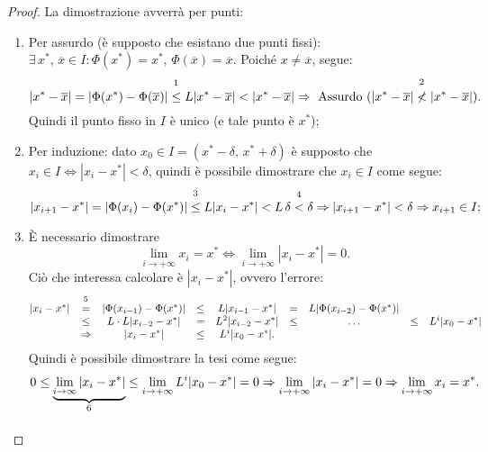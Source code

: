 \begin{proof}
	La dimostrazione avverrà per punti:
	\begin{enumerate}
		\item Per assurdo (è supposto che esistano due punti fissi): $\exists\, x^*,\, \overline{x}\in I: \Phi(x^*)=x^*,\, \Phi(\overline{x})=\overline{x}$. Poiché $x \neq \overline{x}$, segue:
		\begin{equation*}
			|x^*-\overline{x}|=|\Phi(x^*)-\Phi(\overline{x})|\overset{\footnotemark}{\leq}L|x^*-\overline{x}|<|x^*-\overline{x}| \Rightarrow\text{ Assurdo } (|x^*-\overline{x}|\overset{\footnotemark}{\nless}|x^*-\overline{x}|).
		\end{equation*}
		Quindi il punto fisso in $I$ è unico (e tale punto è $x^*$);
		\addtocounter{footnote}{-1}
		\item Per induzione: dato $x_0 \in I = (x^*-\delta,\, x^* + \delta)$ è supposto che $x_i\in I \iff |x_i-x^*|<\delta$, quindi è possibile dimostrare che $x_i\in I$ come segue:
		\begin{equation*}
			|x_{i+1}-x^*|=|\Phi(x_i)-\Phi(x^*)|\overset{\footnotemark}{\leq}L|x_i - x^*| < L\,\delta\overset{\footnotemark}{<}\delta\Rightarrow |x_{i+1}-x^*|<\delta\Rightarrow x_{i+1}\in I;
		\end{equation*}
		\item È necessario dimostrare
		\begin{equation*}
			\lim_{i\to + \infty}{x_i}=x^*\iff \lim_{i\to + \infty}{|x_i-x^*|}=0.
		\end{equation*}
		Ciò che interessa calcolare è $|x_i-x^*|$, ovvero l'errore:
		\begin{equation*}
			\begin{matrix}
				|x_i-x^*|&\overset{\footnotemark}{=}&|\Phi(x_{i-1})-\Phi(x^*)|&\leq& L|x_{i-1}-x^*|&=& L|\Phi(x_{i-2})-\Phi(x^*)|\\
				&\leq& L\cdot L |x_{i-2}-x^*|&=& L^2|x_{i-2}-x^*|&\leq& \hdots &\leq& L^i|x_0-x^*|\\
				&\Rightarrow& |x_i-x^*|&\leq& L^i|x_0-x^*|.
			\end{matrix}
		\end{equation*}
		Quindi è possibile dimostrare la tesi come segue:
		\begin{equation*}
			0\leq \underbrace{\lim_{i \to\infty}{|x_i-x^*|}}_{\footnotemark}\leq\lim_{i\to + \infty}{L^i|x_0-x^*|}=0\Rightarrow \lim_{i\to + \infty}{|x_i-x^*|}=0\Rightarrow\lim_{i\to + \infty}{x_i=x^*}.
		\end{equation*}
	\end{enumerate}
\end{proof}

